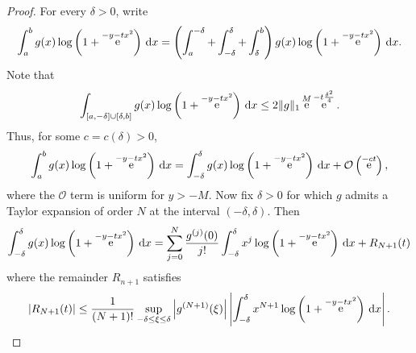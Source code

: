\documentclass[reqno,a4paper,11pt]{amsart}
\DeclareMathOperator{\ee}{\rm e}
\newcommand{\Boh}{\mathcal{O}}
\newcommand{\dd}{\mathrm{d}}
\theoremstyle{definition}
\theoremstyle{remark}
\numberwithin{equation}{section}
\begin{document}
\begin{proof}
    For every $\delta > 0$, write
    \[
        \int_{a}^b g(x) \log\left(1 + \ee^{- y - t x^2} \right) \, \dd x = 
        \left( \int_{a}^{-\delta} + \int_{-\delta}^\delta + \int_\delta^b  \right) g(x)  \log\left(1 + \ee^{- y - t x^2} \right) \, \dd x.
    \]
    Note that
    \[
       \int_{[a, -\delta] \cup [\delta, b]} g(x) \log\left(1 + \ee^{- y - t x^2} \right) \, \dd x  \leq 2 \| g \|_1 \ee^M \ee^{-t \frac{\delta^2}{4}}.
    \]
    Thus, for some $c = c(\delta)> 0$,
    \begin{equation}\label{eq:appendix1_estimate1}
        \int_{a}^b g(x) \log\left(1 + \ee^{- y - t x^2} \right) \, \dd x = 
        \int_{-\delta}^\delta g(x) \log\left(1 + \ee^{- y - t x^2} \right) \, \dd x +  \Boh \left( \ee^{- c t}\right),
    \end{equation}
    where the $\Boh$ term is uniform for $y > -M$.
    Now fix $\delta > 0$ for which $g$ admits a Taylor expansion of order $N$ at the interval $(-\delta, \delta)$. Then
    \[
        \int_{-\delta}^\delta g(x) \log\left(1 + \ee^{- y - t x^2} \right) \, \dd x 
        = \sum_{j=0}^N \frac{g^{(j)}(0)}{j!} \int_{-\delta}^\delta x^j \log\left(1 + \ee^{- y - t x^2} \right) \, \dd x + R_{N+1}(t)
    \]
    where the remainder $R_{n+1}$ satisfies
    \[
        \left| R_{N+1}(t) \right| \leq \frac{1}{(N+1)!} \sup_{- \delta \leq \xi \leq \delta} \left| g^{(N+1)}(\xi) \right| \left| \int_{-\delta}^{\delta} x^{N+1} \log\left(1 + \ee^{- y - t x^2} \right) \, \dd x \right|.
    \]


\end{proof}
\end{document}
